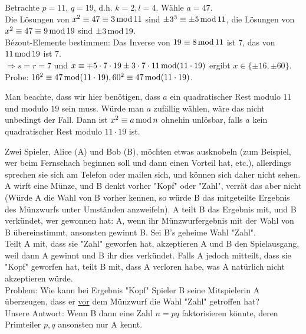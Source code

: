 \begin{bsp}
	Betrachte $p = 11$, $q = 19$, d.h. $k = 2, l = 4$. Wähle $a = 47$. \\
	Die Lösungen von $x^2 \equiv 47 \equiv 3 \operatorname{mod} 11$ sind $\pm 3^3 \equiv \pm 5 \operatorname{mod} 11$, die Lösungen von $x^2 \equiv 47 \equiv 9 \operatorname{mod} 19$ sind $\pm 3 \operatorname{mod} 19$. \\
	Bézout-Elemente bestimmen: Das Inverse von $19 \equiv 8 \operatorname{mod} 11$ ist $7$, das von $11 \operatorname{mod} 19$ ist $7$. \\
	$\Rightarrow s = r = 7$ und $x \equiv \mp 5 \cdot 7 \cdot 19 \pm 3 \cdot 7 \cdot 11 \operatorname{mod} (11 \cdot 19)$ ergibt $x \in \{\pm 16, \pm 60\}$.\\
	Probe: $16^2 \equiv 47 \operatorname{mod} (11 \cdot 19), 60^2 \equiv 47 \operatorname{mod} (11 \cdot 19)$. \checkmark
\end{bsp}

Man beachte, dass wir hier benötigen, dass $a$ ein quadratischer Rest modulo $11$ und modulo $19$ sein muss. Würde man $a$ zufällig wählen, wäre das nicht unbedingt der Fall. Dann ist $x^2 \equiv a \operatorname{mod} n$ ohnehin unlösbar, falls $a$ kein quadratischer Rest modulo $11 \cdot 19$ ist.

\begin{anw}
	Zwei Spieler, Alice (A) und Bob (B), möchten etwas ausknobeln (zum Beispiel, wer beim Fernschach beginnen soll und dann einen Vorteil hat, etc.), allerdings sprechen sie sich am Telefon oder mailen sich, und können sich daher nicht sehen. A wirft eine Münze, und B denkt vorher "Kopf" oder "Zahl", verrät das aber nicht (Würde A die Wahl von B vorher kennen, so würde B das mitgeteilte Ergebnis des Münzwurfs unter Umständen anzweifeln). A teilt B das Ergebnis mit, und B verkündet, wer gewonnen hat: A, wenn ihr Münzwurfergebnis mit der Wahl von B übereinstimmt, ansonsten gewinnt B. Sei B's geheime Wahl "Zahl". \\
	Teilt A mit, dass sie "Zahl" geworfen hat, akzeptieren A und B den Spielausgang, weil dann A gewinnt und B ihr dies verkündet. Falls A jedoch mitteilt, dass sie "Kopf" geworfen hat, teilt B mit, dass A verloren habe, was A natürlich nicht akzeptieren würde.\\
	Problem: Wie kann bei Ergebnis "Kopf" Spieler B seine Mitspielerin A überzeugen, dass er \underline{vor} dem Münzwurf die Wahl "Zahl" getroffen hat? \\
	Unsere Antwort: Wenn B dann eine Zahl $n = pq$ faktorisieren könnte, deren Primteiler $p,q$ ansonsten nur A kennt.
\end{anw}

